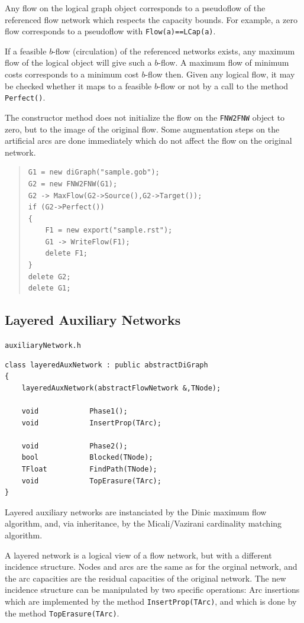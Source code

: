 \documentclass[a4paper,11pt,twoside]{book}
\begin{document}
\begin{multicols}{2}
Any flow on the logical graph object corresponds to a pseudoflow of the
referenced flow network which respects the capacity bounds. For example,
a zero flow corresponds to a pseudoflow with \verb/Flow(a)==LCap(a)/.

If a feasible $b$-flow (circulation) of the referenced networks exists, any
maximum flow of the logical object will give such a $b$-flow. A maximum flow
of minimum costs corresponds to a minimum cost $b$-flow then. Given any
logical flow, it may be checked whether it maps to a feasible $b$-flow or
not by a call to the method \verb/Perfect()/.

The constructor method does not initialize the flow on the \verb/FNW2FNW/
object to zero, but to the image of the original flow. Some augmentation steps
on the artificial arcs are done immediately which do not affect the flow on
the original network.
\sample
\begin{quote}
\begin{verbatim}
G1 = new diGraph("sample.gob");
G2 = new FNW2FNW(G1);
G2 -> MaxFlow(G2->Source(),G2->Target());
if (G2->Perfect())
{
    F1 = new export("sample.rst");
    G1 -> WriteFlow(F1);
    delete F1;
}
delete G2;
delete G1;
\end{verbatim}
\end{quote}


\subsection{Layered Auxiliary Networks}
\label{slb232}
\myinclude\verb/auxiliaryNetwork.h/
\begin{mymethods}
\begin{verbatim}
class layeredAuxNetwork : public abstractDiGraph
{
    layeredAuxNetwork(abstractFlowNetwork &,TNode);

    void            Phase1();
    void            InsertProp(TArc);

    void            Phase2();
    bool            Blocked(TNode);
    TFloat          FindPath(TNode);
    void            TopErasure(TArc);
}
\end{verbatim}
\end{mymethods}
Layered auxiliary networks are instanciated by the Dinic maximum flow algorithm,
and, via inheritance, by the Micali/Vazirani cardinality matching algorithm.

A layered network is a logical view of a flow network, but with a different
incidence structure. Nodes and arcs are the same as for the orginal network,
and the arc capacities are the residual capacities of the original network.
The new incidence structure can be manipulated by two specific operations:
Arc insertions which are implemented by the method \verb/InsertProp(TArc)/, and
 which is done by the method \verb/TopErasure(TArc)/.


\end{multicols}
\end{document}
